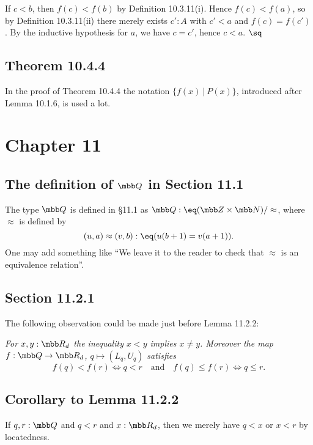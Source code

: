 \documentclass[12pt]{article}
\begin{document}
If $c<b$, then $f(c)<f(b)$ by Definition 10.3.11(i). Hence $f(c)<f(a)$, so by Definition 10.3.11(ii) there merely exists $c':A$ with $c'<a$ and $f(c)=f(c')$. By the inductive hypothesis for $a$, we have $c=c'$, hence $c<a$. $\sq$


\subsection{Theorem 10.4.4}

In the proof of Theorem 10.4.4 the notation $\{f(x)\ \vert\ P(x)\}$, introduced after Lemma 10.1.6, is used a lot.


\section{Chapter 11}

\subsection[The definition of Q in Section 11.1]{The definition of $\mbb Q$ in Section 11.1}

The type $\mbb Q$ is defined in \S11.1 as $\mbb Q:\eq(\mbb Z\times\mbb N)/\approx$, where $\approx$ is defined by 
$$
(u,a)\approx(v,b):\eq(u(b+1)=v(a+1)).
$$ 
One may add something like ``We leave it to the reader to check that $\approx$ is an equivalence relation''.


\subsection{Section 11.2.1}

The following observation could be made just before Lemma 11.2.2: 

\nn\emph{For $x,y:\mbb R_d$ the inequality $x<y$ implies $x\neq y$. Moreover the map $f:\mbb Q\to\mbb R_d$, $q\mapsto(L_q,U_q)$ satisfies}
$$
f(q)<f(r)\iff q<r\quad\text{and}\quad f(q)\le f(r)\iff q\le r.
$$ 


\subsection{Corollary to Lemma 11.2.2}\label{1122}

If $q,r:\mbb Q$ and $q<r$ and $x:\mbb R_d$, then we merely have $q<x$ or $x<r$ by locatedness.
\end{document}
